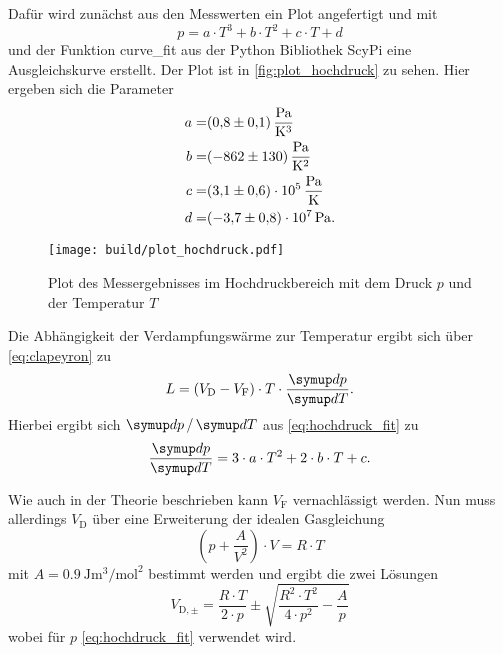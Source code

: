Dafür wird zunächst aus den Messwerten ein Plot angefertigt und mit
\begin{equation}
    p = a \cdot T^3 + b \cdot T^2 + c \cdot T + d
    \label{eq:hochdruck_fit}
\end{equation}
und der Funktion curve\_fit aus der Python Bibliothek ScyPi eine Ausgleichskurve erstellt.\cite{scipy}
Der Plot ist in \autoref{fig:plot_hochdruck} zu sehen.
Hier ergeben sich die Parameter
\begin{align*}
    a =& \SI{0.8+-0.1}{\pascal\per\kelvin\cubed} \\
    b =& \SI{-862+-130}{\pascal\per\kelvin\squared} \\
    c =& \SI{3.1+-0.6e5}{\pascal\per\kelvin} \\
    d =& \SI{-3.7+-0.8e7}{\pascal}.
\end{align*}

\begin{figure}
    \centering
    \texttt{[image: build/plot\_hochdruck.pdf]}
    \caption{Plot des Messergebnisses im Hochdruckbereich mit dem Druck $p$ und der Temperatur $T$}
    \label{fig:plot_hochdruck}
\end{figure}

Die Abhängigkeit der Verdampfungswärme zur Temperatur ergibt sich über \autoref{eq:clapeyron} zu
\begin{equation}
    L = (V_\text{D}-V_\text{F}) \cdot T \cdot \frac{\dif{p}}{\dif{T}}.
    \label{eq:hochdruck_ergebnis}
\end{equation}
Hierbei ergibt sich $\dif{p}/\dif{T}$ aus \autoref{eq:hochdruck_fit} zu
\begin{equation}
    \frac{\dif{p}}{\dif{T}} = 3 \cdot a \cdot T^2 + 2 \cdot b \cdot T + c.
    \label{eq:ableitung}
\end{equation}

Wie auch in der Theorie beschrieben kann $V_\text{F}$ vernachlässigt werden. 
Nun muss allerdings $V_\text{D}$ über eine Erweiterung der idealen Gasgleichung
\begin{equation}
    \left( p + \frac{A}{V^2} \right) \cdot V = R \cdot T
\end{equation}
mit $A = \SI{0.9}{\joule\meter\cubed\per\mol\squared}$ bestimmt werden und ergibt die zwei Lösungen
\begin{equation}
    V_{\text{D},\pm} = \frac{R \cdot T}{2 \cdot p} \pm \sqrt{\frac{R^2 \cdot T^2}{4 \cdot p^2} - \frac{A}{p}}
\end{equation}
wobei für $p$ \autoref{eq:hochdruck_fit} verwendet wird.\cite{V203}

